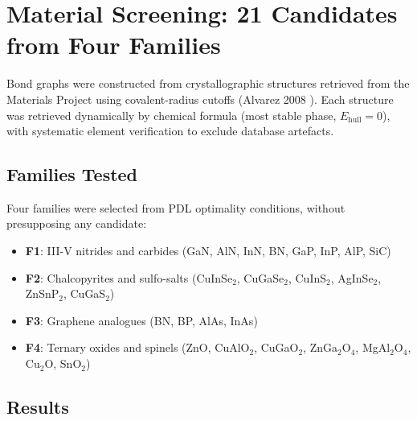 \documentclass[12pt,a4paper]{article}
\begin{document}
\section{Material Screening: 21 Candidates from Four Families}
\label{sec:screening}

Bond graphs were constructed from crystallographic structures retrieved
from the Materials Project \cite{Jain2013} using covalent-radius cutoffs
(Alvarez 2008 \cite{Alvarez2008}). Each structure was retrieved dynamically
by chemical formula (most stable phase, $E_{\mathrm{hull}} = 0$), with
systematic element verification to exclude database artefacts.

\subsection{Families Tested}

Four families were selected from PDL optimality conditions, without
presupposing any candidate:
\begin{itemize}[noitemsep]
  \item \textbf{F1}: III-V nitrides and carbides (GaN, AlN, InN, BN,
    GaP, InP, AlP, SiC)
  \item \textbf{F2}: Chalcopyrites and sulfo-salts (CuInSe$_2$,
    CuGaSe$_2$, CuInS$_2$, AgInSe$_2$, ZnSnP$_2$, CuGaS$_2$)
  \item \textbf{F3}: Graphene analogues (BN, BP, AlAs, InAs)
  \item \textbf{F4}: Ternary oxides and spinels (ZnO, CuAlO$_2$,
    CuGaO$_2$, ZnGa$_2$O$_4$, MgAl$_2$O$_4$, Cu$_2$O, SnO$_2$)
\end{itemize}

\subsection{Results}
\end{document}
